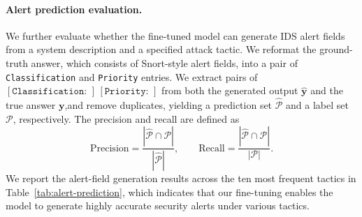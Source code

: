 \documentclass[sigconf]{acmart}
\begin{document}
\paragraph{Alert prediction evaluation.}
We further evaluate whether the fine-tuned model can generate IDS alert fields from a system description and a specified attack tactic. We reformat the ground-truth answer, which consists of Snort-style alert fields, into a pair of  \texttt{Classification} and \texttt{Priority} entries.  We extract pairs of \([\texttt{Classification: }]\,[\texttt{Priority: }]\) from both the generated output $\hat{\mathbf y}$ and the true answer $\mathbf y$,and remove duplicates, yielding a prediction set $\widehat{\mathcal P}$ and a label set $\mathcal P$, respectively. The precision and recall are defined as
\begin{equation*}
    \mathrm{Precision}
    =
    \frac{|\widehat{\mathcal P}\cap\mathcal P|}
    {|\widehat{\mathcal P}|},
    \qquad
    \mathrm{Recall}
    =
    \frac{|\widehat{\mathcal P}\cap\mathcal P|}
    {|\mathcal P|}.
\end{equation*}
We report the alert-field generation results across the ten most frequent tactics in Table~\ref{tab:alert-prediction}, which indicates that our fine-tuning enables the model to generate highly accurate security alerts under various tactics.
\end{document}
